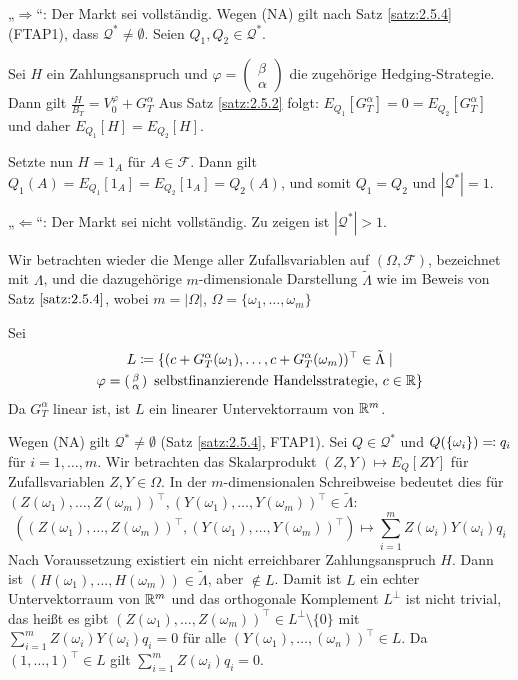 \documentclass[a4paper,twoside,DIV15,BCOR12mm]{scrbook}
\newcommand{\cF}{\mathcal F}
\newcommand{\cQ}{\mathcal Q}
\begin{document}
\begin{beweis}
„$\Longrightarrow$“: Der Markt sei vollständig. Wegen (NA) gilt nach Satz \ref{satz:2.5.4} (FTAP1), dass $\cQ^* \ne \emptyset$. Seien $Q_1,Q_2\in \cQ^*$.


Sei $H$ ein Zahlungsanspruch und
$\varphi=\left(\begin{smallmatrix} \beta \\ \alpha \end{smallmatrix}\right)$
die zugehörige Hedging-Strategie. Dann gilt
$ \frac{H}{B_T} = V_0^\varphi + G_T^\alpha $
Aus Satz \ref{satz:2.5.2} folgt: $E_{Q_1}[G_T^\alpha] = 0 = E_{Q_2}[G_T^\alpha]$ und daher $E_{Q_1}[H] = E_{Q_2}[H]$.

Setzte nun $H=1_A$ für $A\in \cF$. Dann gilt $Q_1(A) = E_{Q_1}[1_A] = E_{Q_2}[1_A] = Q_2(A)$, und somit $Q_1 = Q_2$ und $|\cQ^*|=1$.

„$\Longleftarrow$“: Der Markt sei nicht vollständig. Zu zeigen ist $|\cQ^*|>1$.

Wir betrachten wieder die Menge aller Zufallsvariablen auf $(\Omega,\cF)$, bezeichnet mit $\Lambda$, und die dazugehörige $m$-dimensionale Darstellung $\tilde\Lambda$ wie im Beweis von Satz $\ref{satz:2.5.4}$, wobei $m=|\Omega|$, $\Omega = \{\omega_1,\ldots,\omega_m\}$

Sei
\begin{multline*}
L \da \{ (c + G_T^\alpha(\omega_1), \ldots, c+ G_T^\alpha(\omega_m))^\top \in \tilde\Lambda \mid \\
\varphi=\left(\begin{smallmatrix} \beta \\ \alpha \end{smallmatrix}\right)
\text{ selbstfinanzierende Handelsstrategie, } c\in \MdR\}
\end{multline*}
Da $G_T^\alpha$ linear ist, ist $L$ ein linearer Untervektorraum von $\mathbb{R}^m$.

Wegen (NA) gilt $\cQ^*\ne \emptyset$ (Satz \ref{satz:2.5.4}, FTAP1). Sei $Q\in\cQ^*$ und $Q(\{\omega_i\})\ad q_i$ für $i=1,\ldots,m$. Wir betrachten das Skalarprodukt $(Z,Y)\mapsto E_Q[ZY]$ für Zufallsvariablen $Z,Y\in\Omega$. In der $m$-dimensionalen Schreibweise bedeutet dies für $(Z(\omega_1),\ldots,Z(\omega_m))^\top, (Y(\omega_1),\ldots,Y(\omega_m))^\top\in \tilde\Lambda$:
\[
((Z(\omega_1),\ldots,Z(\omega_m))^\top, (Y(\omega_1),\ldots,Y(\omega_m))^\top) \mapsto \sum_{i=1}^m Z(\omega_i)Y(\omega_i)q_i
\]
Nach Voraussetzung existiert ein nicht erreichbarer Zahlungsanspruch $H$. Dann ist $(H(\omega_1),\ldots,H(\omega_m)) \in \tilde\Lambda$, aber $\notin L$. Damit ist $L$ ein echter Untervektorraum von $\mathbb{R}^m$ und das orthogonale Komplement $L^\bot$ ist nicht trivial, das heißt  es gibt $(Z(\omega_1),\ldots,Z(\omega_m))^\top\in L^\bot\setminus\{0\}$ mit $\sum_{i=1}^m Z(\omega_i)Y(\omega_i)q_i= 0$ für alle $(Y(\omega_1),\ldots,(\omega_n))^\top\in L$. Da $(1,\ldots,1)^\top\in L$ gilt $\sum_{i=1}^mZ(\omega_i)q_i = 0$.


\end{beweis}
\end{document}
